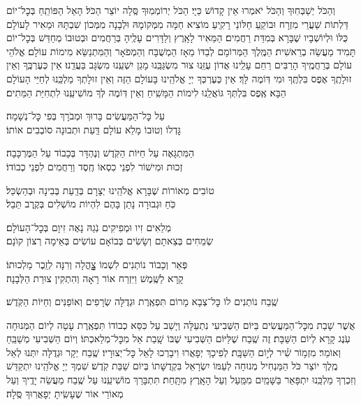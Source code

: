 \documentclass[twoside, openany, parskip=half, 11pt]{book}
\begin{document}
וְהַכֹּל יְשַׁבְּחֽוּךָ וְהַכֹּל יֹאמְרוּ אֵין קָדוֹשׁ כַּיָי׃ הַכֹּל יְרוֹמְמֽוּךָ סֶּֽלָה יוֹצֵר הַכֹּל׃ הָאֵל הַפּוֹתֵֽחַ בְּכׇל־יוֹם דַּלְתוֹת שַׁעֲרֵי מִזְרָח
וּבוֹקֵֽעַ חַלּוֹנֵי רָקִֽיעַ מוֹצִיא חַמָּה מִמְּקוֹמָהּ וּלְבָנָה מִמְּכוֹן שִׁבְתָּהּ
וּמֵאִיר לָעוֹלָם כֻּלּוֹ וּלְיוֹשְׁבָיו שֶׁבָּרָא בְּמִדַּת רַחֲמִים׃ הַמֵּאִיר לָאָֽרֶץ וְלַדָּרִים עָלֶֽיהָ בְּרַחֲמִים וּבְטוּבוֹ מְחַדֵּשׁ בְּכׇל־יוֹם תָּמִיד מַעֲשֵׂה בְרֵאשִׁית׃
הַמֶּֽלֶךְ הַמְּרוֹמָם לְבַדּוֹ מֵאָז הַמְשֻׁבָּח וְהַמְפֹאָר וְהַמִּתְנַשֵּׂא מִימוֹת עוֹלָם׃ אֱלֹהֵי עוֹלָם בְּרַחֲמֶֽיךָ הָרַבִּים רַחֵם עָלֵֽינוּ אֲדוֹן עֻזֵּֽנוּ צוּר מִשְׂגַּבֵּֽנוּ מָגֵן יִשְׁעֵֽנוּ מִשְׂגָּב בַּעֲדֵֽנוּ׃
אֵין כְּעֶרְכֶּֽךָ וְאֵין זוּלָתֶֽךָ אֶפֶס בִּלְתֶּֽךָ וּמִי דּֽוֹמֶה לָּךְ׃
אֵין כְּעֶרְכְּךָ יְיָ אֱלֹהֵֽינוּ בָּעוֹלָם הַזֶּה וְאֵין זוּלָתְךָ מַלְכֵּֽנוּ לְחַיֵּי הָעוֹלָם הַבָּא׃
אֶֽפֶס בִּלְתְּךָ גּוֹאֲלֵֽנוּ לִימוֹת הַמָּשִֽׁיחַ וְאֵין דּֽוֹמֶה לְּךָ מוֹשִׁיעֵֽנוּ לִתְחִיַּת הַמֵּתִים׃

עַל כׇּל־הַמַּעֲשִׂים \hfill בָּרוּךְ וּמְבֹרָךְ בְּפִי כׇּל־נְשָׁמָה׃ \\
גׇּדְלוֹ וְטוּבוֹ מָלֵא עוֹלָם \hfill דַּֽעַת וּתְבוּנָה סוֹבְבִים אוֹתוֹ׃

הַמִּתְגָּאֶה עַל חַיּוֹת הַקֹּֽדֶשׁ \hfill וְנֶהְדָּר בְּכָבוֹד עַל הַמֶּרְכָּבָה׃\\
זְכוּת וּמִישׁוֹר לִפְנֵי כִסְאוֹ \hfill חֶֽסֶד וְרַחֲמִים לִפְנֵי כְבוֹדוֹ׃

טוֹבִים מְאוֹרוֹת שֶׁבָּרָא אֱלֹהֵֽינוּ \hfill יְצָרָם בְּדַֽעַת בְּבִינָה וּבְהַשְׂכֵּל׃\\
כֹּֽחַ וּגְבוּרָה נָתַן בָּהֶם \hfill לִהְיוֹת מוֹשְׁלִים בְּקֶֽרֶב תֵּבֵל׃

מְלֵאִים זִיו וּמְפִיקִים נֹֽגַהּ \hfill נָאֶה זִיוָם בְּכׇל־הָעוֹלָם׃ \\
שְׂמֵחִים בְּצֵאתָם וְשָׂשִׂים בְּבוֹאָם \hfill עוֹשִׂים בְּאֵימָה רְצוֹן קוׂנָם׃

פְּאֵר וְכָבוֹד נוֹתְנִים לִשְׁמוֹ \hfill צׇׇׇׇׇהֳלָה וְרִנָּה לְזֵֽכֶר מַלְכוּתוֹ׃ \\
קָרָא לַשֶּֽׁמֶשׁ וַיִּזְרַח אוֹר \hfill רָאָה וְהִתְקִין צוּרַת הַלְּבָנָה׃

שֶֽׁבַח נוֹתְנִים לוֹ כׇּל־צְבָא מָרוֹם \hfill תִּפְאֶֽרֶת וּגְדֻלָּה שְׂרָפִים וְאוֹפַנִּים וְחַיּוֹת הַקֹּֽדֶשׁ׃

אֲשֶׁר שָׁבַת מִכׇּל־הַמַּעֲשִׂים בַּיּוֹם הַשְּׁבִיעִי נִתְעַלָּה וְיָשַׁב עַל כִּסֵּא כְבוֹדוֹ תִּפְאֶֽרֶת עָטָה לְיוֹם הַמְּנוּחָה עֹֽנֶג קָרָא לְיוֹם הַשַּׁבָּת׃ זֶה שֶֽׁבַח שֶׁלַּיּוֹם הַשְּׁבִיעִי שֶׁבּוֹ שָֽׁבַת אֵל מִכׇּל־מְלַאכְתּוֹ׃ וְיוֹם הַשְּׁבִיעִי מְשַׁבֵּֽחַ וְאוֹמֵר׃
%
מִזְמ֥וֹר שִׁ֗יר לְי֣וֹם הַשַּׁבָּֽת׃
לְפִיכָךְ יְפָאֲרוּ וִיבָרְכוּ לָאֵל כׇּל־יְצוּרָיו׃ שֶֽׁבַח יְקָר וּגְדֻלָּה יִתְּנוּ לְאֵל מֶֽלֶךְ יוֹצֵר כֹּל הַמַּנְחִיל מְנוּחָה לְעַמּוֹ יִשְׂרָאֵל בִּקְדֻשָּׁתוֹ בְּיוֹם שַׁבַּת קֹֽדֶשׁ׃ שִׁמְךָ יְיָ אֱלֹהֵֽינוּ יִתְקַדַּשׁ וְזִכְרְךָ מַלְכֵּֽנוּ יִתְפָּאַר בַּשָּׁמַֽיִם מִמַּֽעַל וְעַל הָאָֽרֶץ מִתָּֽחַת׃ תִּתְבָּרַךְ מוֹשִׁיעֵֽנוּ עַל שֶֽׁבַח מַעֲשֵׂה יָדֶֽיךָ וְעַל מְאוֹרֵי אוֹר שֶׁעָשִֽׂיתָ יְפָאֲרֽוּךָ סֶּֽלָה׃
\end{document}
